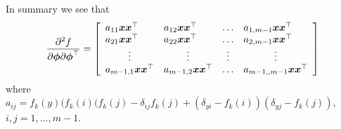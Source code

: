 In summary we see that
\[
\frac{\partial^2 f}{\partial \bphi \partial \bphi^{\top}} = 
\left [ \begin{array}{llcl}
        a_{11} \bx \bx^{\top} & a_{12} \bx \bx^{\top} &
        \ldots & a_{1,m-1} \bx \bx^{\top} \\
        a_{21} \bx \bx^{\top} & a_{22} \bx \bx^{\top} &
        \ldots & a_{2,m-1} \bx \bx^{\top} \\
        \multicolumn{1}{c}{\vdots} &
        \multicolumn{1}{c}{\vdots} &
        \multicolumn{1}{c}{\vdots} &
        \multicolumn{1}{c}{\vdots} \\
        a_{m-1,1} \bx \bx^{\top} & a_{m-1,2} \bx \bx^{\top} &
        \ldots & a_{m-1,,m-1} \bx \bx^{\top} \end{array}
\right ]
\]
where $a_{ij} =  f_k(y)(f_k(i)(f_k(j) - \delta_{ij}f_k(j) +
(\delta_{yi} - f_k(i))(\delta_{yj} - f_k(j))$, $i, j = 1, \ldots, m - 1$.

